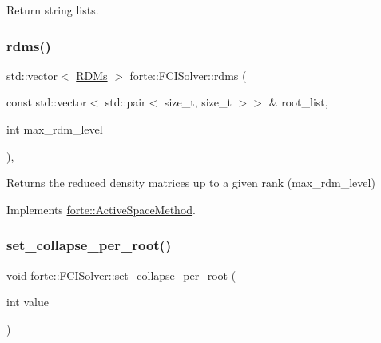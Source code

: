 Return string lists. 

\mbox{\label{classforte_1_1_f_c_i_solver_a40d53f62ae73a7baf7560dac37838b8b}} 
\subsubsection{\texorpdfstring{rdms()}{rdms()}}
{\footnotesize\ttfamily std\+::vector$<$ \mbox{\hyperlink{classforte_1_1_r_d_ms}{R\+D\+Ms}} $>$ forte\+::\+F\+C\+I\+Solver\+::rdms (\begin{DoxyParamCaption}\item[{const std\+::vector$<$ std\+::pair$<$ size\+\_\+t, size\+\_\+t $>$$>$ \&}]{root\+\_\+list,  }\item[{int}]{max\+\_\+rdm\+\_\+level }\end{DoxyParamCaption})\hspace{0.3cm}{\ttfamily [override]}, {\ttfamily [virtual]}}



Returns the reduced density matrices up to a given rank (max\+\_\+rdm\+\_\+level) 



Implements \mbox{\hyperlink{classforte_1_1_active_space_method_a0b2c4903551a7602db815d67349ba7c9}{forte\+::\+Active\+Space\+Method}}.

\mbox{\label{classforte_1_1_f_c_i_solver_a68ac8d378e848ce9a058716095ac37d7}} 
\subsubsection{\texorpdfstring{set\+\_\+collapse\+\_\+per\+\_\+root()}{set\_collapse\_per\_root()}}
{\footnotesize\ttfamily void forte\+::\+F\+C\+I\+Solver\+::set\+\_\+collapse\+\_\+per\+\_\+root (\begin{DoxyParamCaption}\item[{int}]{value }\end{DoxyParamCaption})}



